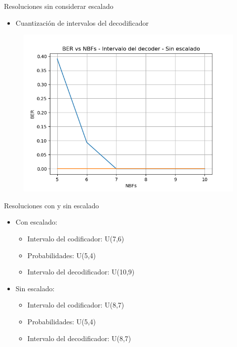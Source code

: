 \documentclass[xcolor=table]{beamer}
\begin{document}
\begin{frame}{Resoluciones sin considerar escalado}
    \begin{itemize}
        \item Cuantización de intervalos del decodificador 
    \end{itemize}
    \begin{figure}
  \centering
  \includegraphics[width=0.60\paperwidth]{Graficos/cuantization6.png}%
\end{figure}
\end{frame}

\begin{frame}{Resoluciones con y sin  escalado}
 \begin{itemize}
     \item Con escalado:
        \begin{itemize}
        \item Intervalo del codificador: U(7,6)
         \item Probabilidades: U(5,4)
        \item Intervalo del decodificador: U(10,9)
        \end{itemize}

     \item  Sin escalado:
        \begin{itemize}
        \item Intervalo del codificador: U(8,7)
         \item Probabilidades: U(5,4)
        \item Intervalo del decodificador: U(8,7)
        \end{itemize}
 \end{itemize}
\end{frame}
\end{document}

